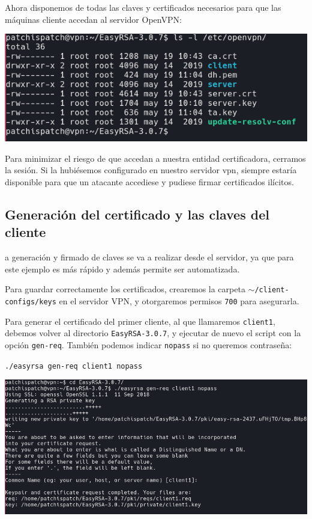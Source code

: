 \documentclass[11pt,a4paper]{article}
\begin{document}
\medskip

Ahora disponemos de todas las claves y certificados necesarios para que las máquinas cliente accedan al servidor OpenVPN:

\medskip

\begin{center}
\includegraphics[scale=0.4]{ls-ovpn.png}
\end{center}

\medskip

Para minimizar el riesgo de que accedan a nuestra entidad certificadora, cerramos la sesión. Si la hubiésemos configurado en nuestro servidor vpn, siempre estaría disponible para que un atacante accediese y pudiese firmar certificados ilícitos.

\subsection{Generación del certificado y las claves del cliente}

a generación y firmado de claves se va a realizar desde el servidor, ya que para este ejemplo es más rápido y además permite ser automatizada.

\medskip

Para guardar correctamente los certificados, crearemos la carpeta \texttt{$\sim$/client-configs/keys} en el servidor VPN, y otorgaremos permisos \texttt{700} para asegurarla.

\medskip

Para generar el certificado del primer cliente, al que llamaremos \texttt{client1}, debemos volver al directorio \texttt{EasyRSA-3.0.7}, y ejecutar de nuevo el script con la opción \texttt{gen-req}. También podemos indicar \texttt{nopass} si no queremos contraseña:

\medskip

\texttt{./easyrsa gen-req client1 nopass}

\medskip

\begin{center}
\includegraphics[scale=0.4]{gen-req-client1.png}
\end{center}
\end{document}

